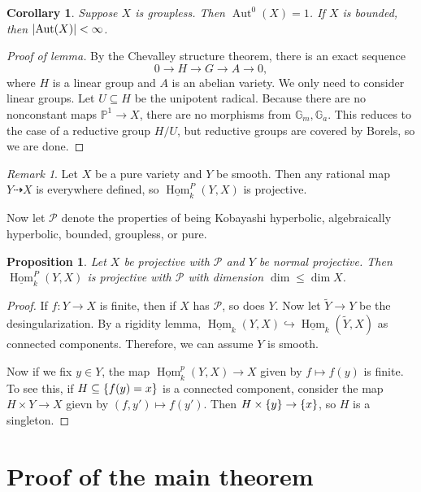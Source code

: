 \documentclass[leqno, openany]{memoir}
\newtheorem{cor}[thm]{Corollary}
\newtheorem{prop}[thm]{Proposition}
\theoremstyle{definition}
\theoremstyle{remark}
\newtheorem{rmk}[thm]{Remark}
\theoremstyle{plain}
\theoremstyle{definition}
\theoremstyle{remark}
\renewcommand{\P}{\mathbb{P}}
\newcommand{\mc}[1]{\mathcal{#1}}
\newcommand{\ul}[1]{\underline{#1}}
\newcommand{\wt}[1]{\widetilde{#1}}
\DeclareMathOperator{\Hom}{Hom}
\DeclareMathOperator{\Aut}{Aut}
\begin{document}
\begin{cor}
    Suppose $X$ is groupless. Then $\Aut^0(X) = \qty{1}$. If $X$ is bounded, then $\abs{\Aut(X)} < \infty$.
\end{cor}

\begin{proof}[Proof of lemma]
    By the Chevalley structure theorem, there is an exact sequence
    \[ 0 \to H \to G \to A \to 0, \]
    where $H$ is a linear group and $A$ is an abelian variety. We only need to consider linear groups. Let $U \subseteq H$ be the unipotent radical. Because there are no nonconstant maps $\P^1 \to X$, there are no morphisms from $\mathbb{G}_m, \mathbb{G}_a$. This reduces to the case of a reductive group $H/U$, but reductive groups are covered by Borels, so we are done.
\end{proof}

\begin{rmk}
    Let $X$ be a pure variety and $Y$ be smooth. Then any rational map $Y \dashrightarrow X$ is everywhere defined, so $\ul{\Hom}_k^P(Y, X)$ is projective.
\end{rmk}

Now let $\mc{P}$ denote the properties of being Kobayashi hyperbolic, algebraically hyperbolic, bounded, groupless, or pure.

\begin{prop}
    Let $X$ be projective with $\mc{P}$ and $Y$ be normal projective. Then $\ul{\Hom}_k^P(Y, X)$ is projective with $\mc{P}$ with dimension $\dim \leq \dim X$.
\end{prop}

\begin{proof}
    If $f \colon Y \to X$ is finite, then if $X$ has $\mc{P}$, so does $Y$. Now let $\wt{Y} \to Y$ be the desingularization. By a rigidity lemma, $\ul{\Hom}_k(Y, X) \hookrightarrow \ul{\Hom}_k(\wt{Y}, X)$ as connected components. Therefore, we can assume $Y$ is smooth.

    Now if we fix $y \in Y$, the map $\ul{\Hom}_k^p(Y, X) \to X$ given by $f \mapsto f(y)$ is finite. To see this, if $H \subseteq \qty{f(y) = x}$ is a connected component, consider the map $H \times Y \to X$ gievn by $(f, y') \mapsto f(y')$. Then $H \times \qty{y} \to \qty{x}$, so $H$ is a singleton.
\end{proof}

\section{Proof of the main theorem}
\end{document}
